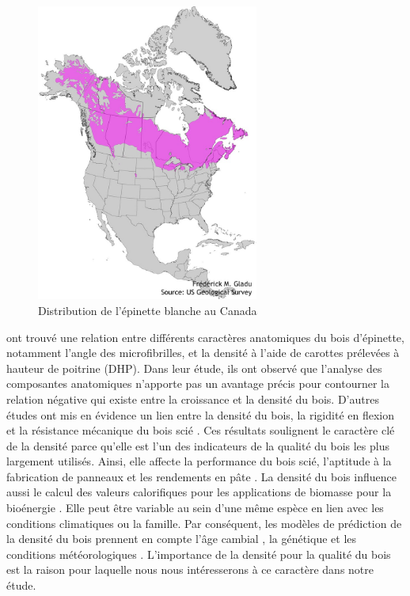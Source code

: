 \documentclass{report}
\begin{document}
\begin{figure}
	
	\centering
	\includegraphics[width=0.65\textwidth]{distribution.jpg}
	\caption{Distribution de l'épinette blanche au Canada}
	\label{fig:distribution}
	
	
\end{figure}


\cite{Ivkovich2002} ont trouvé une relation entre différents caractères anatomiques du bois d'épinette, notamment l'angle des microfibrilles, et la densité à l'aide de carottes prélevées à hauteur de poitrine (DHP). Dans leur étude, ils ont observé que l'analyse des composantes anatomiques n'apporte pas un avantage précis pour contourner la relation négative qui existe entre la croissance et la densité du bois. D'autres études ont mis en évidence un lien entre la densité du bois, la rigidité en flexion et la résistance mécanique du bois scié \citep{Saranpaa1994,Alteyrac2006}. Ces résultats soulignent le caractère clé de la densité parce qu'elle est l'un des indicateurs de la qualité du bois les plus largement utilisés. Ainsi, elle affecte la performance du bois scié, l'aptitude à la fabrication de panneaux et les rendements en pâte \citep{Macdonald2002}. La densité du bois influence aussi le calcul des valeurs calorifiques pour les applications de biomasse pour la bioénergie \citep{Mckendry2002}. Elle peut être variable au sein d'une même espèce en lien avec les conditions climatiques ou la famille. Par conséquent, les modèles de prédiction de la densité du bois prennent en compte l'âge cambial \citep{David2014}, la génétique et les conditions météorologiques \citep{Wilkinson2015}. L'importance de la densité pour la qualité du bois est la raison pour laquelle nous nous intéresserons à ce caractère dans notre étude. \\
\end{document}
